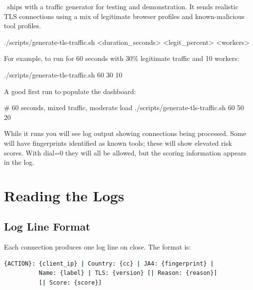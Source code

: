 \ja\ ships with a traffic generator for testing and demonstration. It sends realistic
TLS connections using a mix of legitimate browser profiles and known-malicious tool
profiles.

\begin{bashcode}
./scripts/generate-tls-traffic.sh <duration_seconds> <legit_percent> <workers>
\end{bashcode}

For example, to run for 60 seconds with 30\% legitimate traffic and 10 workers:

\begin{bashcode}
./scripts/generate-tls-traffic.sh 60 30 10
\end{bashcode}

A good first run to populate the dashboard:

\begin{bashcode}
# 60 seconds, mixed traffic, moderate load
./scripts/generate-tls-traffic.sh 60 50 20
\end{bashcode}

While it runs you will see log output showing connections being processed. Some will
have fingerprints identified as known tools; these will show elevated risk scores.
With dial=0 they will all be allowed, but the scoring information appears in the log.

\section{Reading the Logs}

\subsection{Log Line Format}

Each connection produces one log line on close. The format is:

\begin{lstlisting}[language=bash, numbers=none]
{ACTION}: {client_ip} | Country: {cc} | JA4: {fingerprint} |
          Name: {label} | TLS: {version} [| Reason: {reason}]
          [| Score: {score}]
\end{lstlisting}

